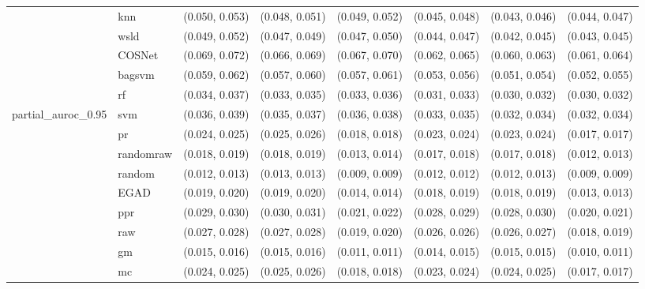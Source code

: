 \begin{table}[H]
{\begin{tabular}{llllllll}
 & knn & (0.050, 0.053) & (0.048, 0.051) & (0.049, 0.052) & (0.045, 0.048) & (0.043, 0.046) & (0.044, 0.047)\\

 & wsld & (0.049, 0.052) & (0.047, 0.049) & (0.047, 0.050) & (0.044, 0.047) & (0.042, 0.045) & (0.043, 0.045)\\

 & COSNet & (0.069, 0.072) & (0.066, 0.069) & (0.067, 0.070) & (0.062, 0.065) & (0.060, 0.063) & (0.061, 0.064)\\

 & bagsvm & (0.059, 0.062) & (0.057, 0.060) & (0.057, 0.061) & (0.053, 0.056) & (0.051, 0.054) & (0.052, 0.055)\\

 & rf & (0.034, 0.037) & (0.033, 0.035) & (0.033, 0.036) & (0.031, 0.033) & (0.030, 0.032) & (0.030, 0.032)\\

\multirow{-15}{*}{\raggedright\arraybackslash partial\_auroc\_0.95} & svm & (0.036, 0.039) & (0.035, 0.037) & (0.036, 0.038) & (0.033, 0.035) & (0.032, 0.034) & (0.032, 0.034)\\
\cmidrule{1-8}
 & pr & (0.024, 0.025) & (0.025, 0.026) & (0.018, 0.018) & (0.023, 0.024) & (0.023, 0.024) & (0.017, 0.017)\\

 & randomraw & (0.018, 0.019) & (0.018, 0.019) & (0.013, 0.014) & (0.017, 0.018) & (0.017, 0.018) & (0.012, 0.013)\\

 & random & (0.012, 0.013) & (0.013, 0.013) & (0.009, 0.009) & (0.012, 0.012) & (0.012, 0.013) & (0.009, 0.009)\\

 & EGAD & (0.019, 0.020) & (0.019, 0.020) & (0.014, 0.014) & (0.018, 0.019) & (0.018, 0.019) & (0.013, 0.013)\\

 & ppr & (0.029, 0.030) & (0.030, 0.031) & (0.021, 0.022) & (0.028, 0.029) & (0.028, 0.030) & (0.020, 0.021)\\

 & raw & (0.027, 0.028) & (0.027, 0.028) & (0.019, 0.020) & (0.026, 0.026) & (0.026, 0.027) & (0.018, 0.019)\\

 & gm & (0.015, 0.016) & (0.015, 0.016) & (0.011, 0.011) & (0.014, 0.015) & (0.015, 0.015) & (0.010, 0.011)\\

 & mc & (0.024, 0.025) & (0.025, 0.026) & (0.018, 0.018) & (0.023, 0.024) & (0.024, 0.025) & (0.017, 0.017)\\


\end{tabular}}
\end{table}
